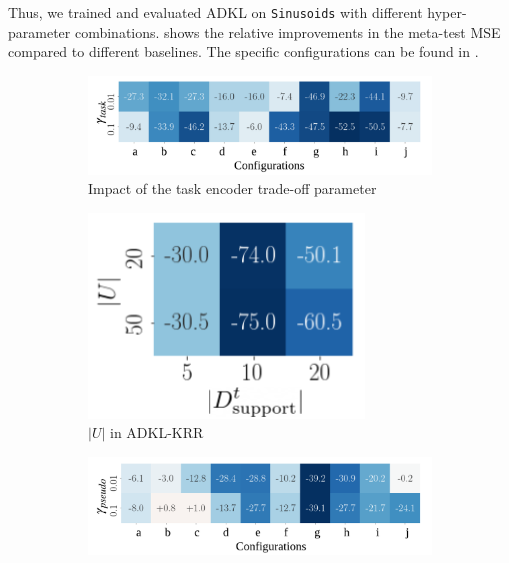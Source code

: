 \documentclass[11pt]{article}
\numberwithin{equation}{subsection}
\begin{document}
Thus, we trained and evaluated ADKL on \texttt{Sinusoids} with different hyper-parameter combinations.
 shows the relative improvements in the meta-test MSE compared to different baselines. The specific configurations can be found in .

\begin{figure}[ht]
    \centering
    \begin{subfigure}[t]{0.72\textwidth}
        \centering
        \includegraphics[width=\linewidth]{adkl/ablation/gamma-task}
        \caption{Impact of the task encoder trade-off parameter}
        \label{fig:gamma-task}
    \end{subfigure}
    \hfill
    \begin{subfigure}[t]{0.26\textwidth}
        \centering
        \includegraphics[width=\linewidth]{adkl/ablation/pseudo-krr}
        \caption{$|U|$ in ADKL-KRR}
        \label{fig:pseudo-krr}
    \end{subfigure}
    \vspace{0.2cm}
    \begin{subfigure}[t]{0.72\textwidth}
        \centering
        \includegraphics[width=\linewidth]{adkl/ablation/gamma-pseudo}

\end{subfigure}
\end{figure}
\end{document}
